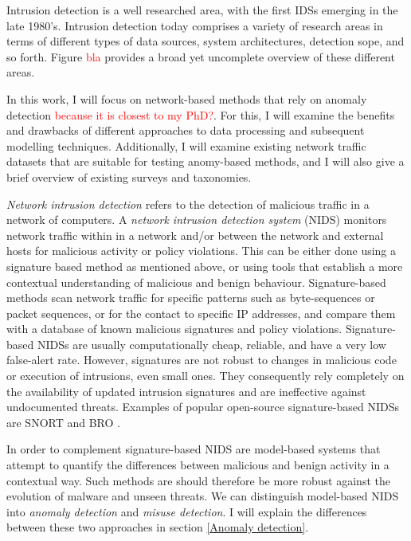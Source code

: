 \documentclass[a4paper,12pt,twoside]{report}
\begin{document}
Intrusion detection is a well researched area, with the first IDSs emerging in the late 1980's. Intrusion detection today comprises a variety of research areas in terms of different types of data sources, system architectures, detection sope, and so forth. Figure \textcolor{red}{bla} provides a broad yet uncomplete overview of these different areas. 




In this work, I will focus on network-based methods that rely on anomaly detection \textcolor{red}{because it is closest to my PhD?}. For this, I will examine the benefits and drawbacks of different approaches to data processing and subsequent modelling techniques. Additionally, I will examine existing network traffic datasets that are suitable for testing anomy-based methods, and I will also give a brief overview of existing surveys and taxonomies.

\textit{Network intrusion detection} refers to the detection of malicious traffic in a network of computers. A \textit{network intrusion detection system} (NIDS) monitors network traffic within in a network and/or between the network and external hosts for malicious activity or policy violations. This can be either done using a signature based method as mentioned above, or using tools that establish a more contextual understanding of malicious and benign behaviour. Signature-based methods scan network traffic for specific patterns such as byte-sequences or packet sequences, or for the contact to specific IP addresses, and compare them with a database of known malicious signatures and policy violations. Signature-based NIDSs are usually computationally cheap, reliable, and have a very low false-alert rate. However, signatures are not robust to changes in malicious code or execution of intrusions, even small ones. They consequently rely completely on the availability of updated intrusion signatures and are ineffective against undocumented threats. Examples of popular open-source signature-based NIDSs are SNORT and BRO \cite{roesch1999snort,paxson2014bro}.

In order to complement signature-based NIDS are model-based systems that attempt to quantify the differences between malicious and benign activity in a contextual way. Such methods are should therefore be more robust against the evolution of malware and unseen threats. We can distinguish model-based NIDS into \textit{anomaly detection} and \textit{misuse detection}. I will explain the differences between these two approaches in section \ref{Anomaly detection}.
\end{document}
